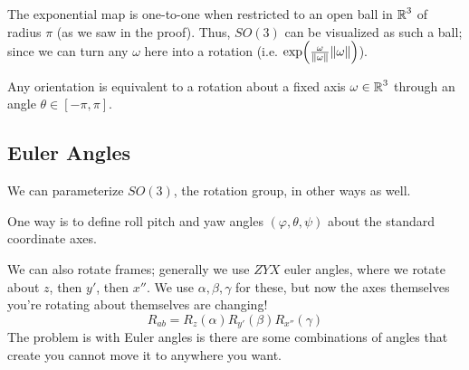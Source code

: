 The exponential map is one-to-one when restricted to an open ball
in $\operatorname{\mathbb{R}}^3$ of radius $\pi$ (as we saw in the proof).
Thus, $SO(3)$ can be visualized as such a ball; since we can
turn any $\omega$ here into a rotation (i.e. $\exp(\frac{\omega}{\norm{\omega}} \norm{\omega})$).

\begin{theorem}[Euler]
    Any orientation is equivalent to a rotation about a fixed axis $\omega \in \operatorname{\mathbb{R}}^3$ through an angle $\theta \in [- \pi, \pi]$.
\end{theorem}

\subsection{Euler Angles}

We can parameterize $SO(3)$, the rotation group, in other ways as well.

One way is to define roll pitch and yaw angles $(\varphi, \theta, \psi)$ about the standard coordinate axes.

We can also rotate frames; generally we use $ZYX$ euler angles, where we rotate about $z$, then $y'$, then $x''$.
We use $\alpha, \beta, \gamma$ for these, but now the axes themselves you're rotating about themselves are changing!
\[ R_{ab} = R_z(\alpha) R_{y'}(\beta) R_{x''}(\gamma) \]
The problem is with Euler angles is there are some combinations of angles that create you cannot move it to anywhere you want.


